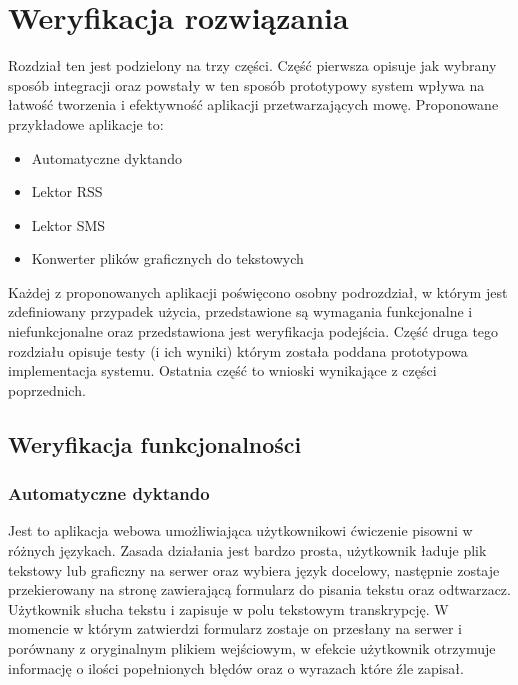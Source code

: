 
\chapter{Weryfikacja rozwiązania} %



\ifpdf
    \graphicspath{{4/figures/PNG/}{4/figures/PDF/}{4/figures/}}
\else
    \graphicspath{{4/figures/EPS/}{4/figures/}}
\fi


Rozdział ten jest podzielony na trzy części. Część pierwsza opisuje jak wybrany sposób integracji oraz powstały w ten sposób prototypowy system wpływa na łatwość tworzenia i efektywność aplikacji przetwarzających mowę. Proponowane przykładowe aplikacje to:
\begin{itemize}
	\item Automatyczne dyktando
	\item Lektor RSS
	\item Lektor SMS
	\item Konwerter plików graficznych do tekstowych
\end{itemize}
Każdej z proponowanych aplikacji poświęcono osobny podrozdział, w którym jest zdefiniowany przypadek użycia, przedstawione są wymagania funkcjonalne i niefunkcjonalne oraz przedstawiona jest weryfikacja podejścia. Część druga tego rozdziału opisuje testy (i ich wyniki) którym została poddana prototypowa implementacja systemu. Ostatnia część to wnioski wynikające z części poprzednich.

\section{Weryfikacja funkcjonalności}
\subsection{Automatyczne dyktando}
Jest to aplikacja webowa umożliwiająca użytkownikowi ćwiczenie pisowni w różnych językach. Zasada działania jest bardzo prosta, użytkownik ładuje plik tekstowy lub graficzny na serwer oraz wybiera język docelowy, następnie zostaje przekierowany na stronę zawierającą formularz do pisania tekstu oraz odtwarzacz. Użytkownik słucha tekstu i zapisuje w polu tekstowym transkrypcję. W momencie w którym zatwierdzi formularz zostaje on przesłany na serwer i porównany z oryginalnym plikiem wejściowym, w efekcie użytkownik otrzymuje informację o ilości popełnionych błędów oraz o wyrazach które źle zapisał. 
